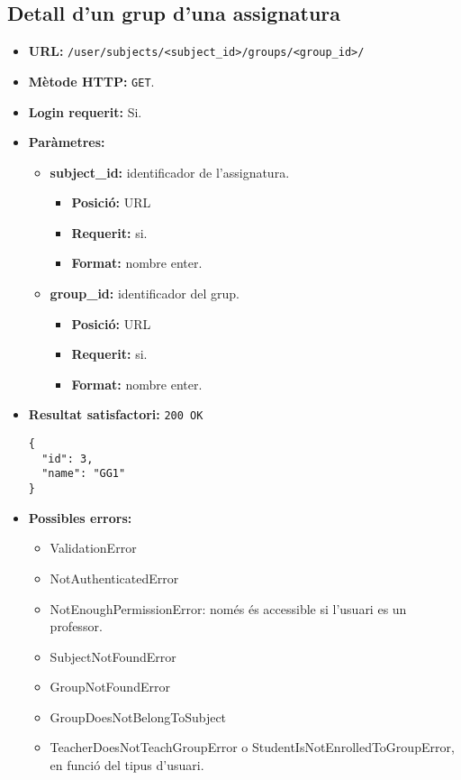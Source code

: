 \subsection{Detall d'un grup d'una assignatura}
\begin{itemize}
\item \textbf{\ac{URL}:} \texttt{/user/subjects/<subject\_id>/groups/<group\_id>/}
\item \textbf{Mètode \ac{HTTP}: } \texttt{GET}.
\item \textbf{Login requerit:} Si.
\item \textbf{Paràmetres:}
	\begin{itemize}
		\item \textbf{subject\_id:} identificador de l'assignatura.
		\begin{itemize}
			\item \textbf{Posició:} \ac{URL}
			\item \textbf{Requerit:} si.
			\item \textbf{Format:} nombre enter.
		\end{itemize}
		\item \textbf{group\_id:} identificador del grup.
		\begin{itemize}
			\item \textbf{Posició:} \ac{URL}
			\item \textbf{Requerit:} si.
			\item \textbf{Format:} nombre enter.
		\end{itemize}
	\end{itemize}

\item \textbf{Resultat satisfactori:} \texttt{200 OK}
	\begin{verbatim}
{
  "id": 3,
  "name": "GG1"
}
	\end{verbatim}
	
	
\item \textbf{Possibles errors:}
	\begin{itemize}
		\item ValidationError
		\item NotAuthenticatedError
		\item NotEnoughPermissionError: només és accessible si l'usuari es un professor.
		\item SubjectNotFoundError
		\item GroupNotFoundError
		\item GroupDoesNotBelongToSubject
		\item TeacherDoesNotTeachGroupError o StudentIsNotEnrolledToGroupError, en funció del tipus d'usuari.
	\end{itemize}
\end{itemize}

